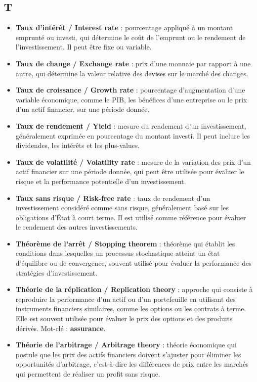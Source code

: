 \documentclass[a4paper,10pt]{article}
\begin{document}
\begin{multicols}{2}
\section*{T}
\begin{itemize}
  \item \textbf{Taux d’intérêt / Interest rate} : pourcentage appliqué à un montant emprunté ou investi, qui détermine le coût de l’emprunt ou le rendement de l’investissement. Il peut être fixe ou variable.
  \item \textbf{Taux de change / Exchange rate} : prix d’une monnaie par rapport à une autre, qui détermine la valeur relative des devises sur le marché des changes.
  \item \textbf{Taux de croissance / Growth rate} : pourcentage d’augmentation d’une variable économique, comme le PIB, les bénéfices d’une entreprise ou le prix d’un actif financier, sur une période donnée.
  \item \textbf{Taux de rendement / Yield} : mesure du rendement d’un investissement, généralement exprimée en pourcentage du montant investi. Il peut inclure les dividendes, les intérêts et les plus-values.
  \item \textbf{Taux de volatilité / Volatility rate} : mesure de la variation des prix d’un actif financier sur une période donnée, qui peut être utilisée pour évaluer le risque et la performance potentielle d’un investissement.
  \item \textbf{Taux sans risque / Risk-free rate} : taux de rendement d’un investissement considéré comme sans risque, généralement basé sur les obligations d’État à court terme. Il est utilisé comme référence pour évaluer le rendement des autres investissements.
  \item \textbf{Théorème de l'arrêt / Stopping theorem} : théorème qui établit les conditions dans lesquelles un processus stochastique atteint un état d’équilibre ou de convergence, souvent utilisé  pour évaluer la performance des stratégies d’investissement.
  \item \textbf{Théorie de la réplication / Replication theory} : approche qui consiste à reproduire la performance d’un actif ou d’un portefeuille en utilisant des instruments financiers similaires, comme les options ou les contrats à terme. Elle est souvent utilisée pour évaluer le prix des options et des produits dérivés. Mot-clé : \textbf{assurance}.
  \item \textbf{Théorie de l’arbitrage / Arbitrage theory} : théorie économique qui postule que les prix des actifs financiers doivent s’ajuster pour éliminer les opportunités d’arbitrage, c’est-à-dire les différences de prix entre les marchés qui permettent de réaliser un profit sans risque.
\end{itemize}


\end{multicols}
\end{document}
